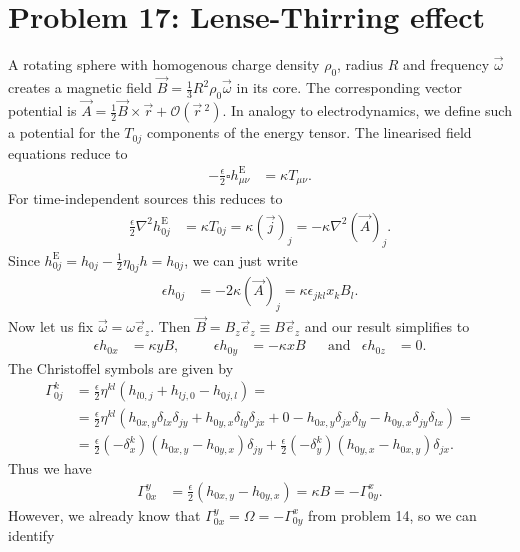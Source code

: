 \documentclass[english, parskip=full]{scrartcl}
\newcommand{\kla}{}
\newcommand{\tecxt}{}
\begin{document}
\section{Problem 17: Lense-Thirring effect}
A rotating sphere with homogenous charge density $\rho_0$, radius $R$ and frequency $\vec{\omega}$ creates a magnetic field $\vec{B} = \frac{1}{3}R^2\rho_0\vec{\omega}$ in its core.
The corresponding vector potential is $\vec{A} = \frac{1}{2} \vec{B}\times\vec{r} + \mathcal{O}(\vec{r}\,^2)$.
In analogy to electrodynamics, we define such a potential for the $T_{0j}$ components of the energy tensor.
The linearised field equations reduce to
\begin{align}
-\frac{\epsilon}{2}\square h^\tecxt\text{E}_{\mu\nu} &= \kappa T_{\mu\nu}.
\end{align}
For time-independent sources this reduces to
\begin{align}
\frac{\epsilon}{2} \nabla^2 h^\tecxt\text{E}_{0j} &= \kappa T_{0j} = \kappa (\vec{j})_j = -\kappa\nabla^2(\vec{A})_j.
\end{align}
Since $h^\tecxt\text{E}_{0j} = h_{0j} - \frac{1}{2}\eta_{0j}h = h_{0j}$, we can just write
\begin{align}
\epsilon h_{0j} &= -2\kappa (\vec{A})_j = \kappa \epsilon_{jkl} x_kB_l.
\end{align}
Now let us fix $\vec{\omega} = \omega\vec{e}_z$.
Then $\vec{B} = B_z \vec{e}_z \equiv B\vec{e}_z$ and our result simplifies to
\begin{align}
\epsilon h_{0x} &= \kappa yB, &&& \epsilon h_{0y} &= -\kappa xB && \tecxt\text{and} & \epsilon h_{0z} &= 0.
\end{align}
The Christoffel symbols are given by
\begin{align}
\Gamma^k_{0j} &= \frac{\epsilon}{2}\eta^{kl} \kla\left( h_{l0,j} + h_{lj,0} - h_{0j,l} \right) = \\
&= \frac{\epsilon}{2} \eta^{kl} \kla\left( h_{0x,y} \delta_{lx}\delta_{jy} + h_{0y,x} \delta_{ly} \delta_{jx} + 0 - h_{0x,y} \delta_{jx} \delta_{ly} - h_{0y,x} \delta_{jy} \delta_{lx} \right) = \\
&= \frac{\epsilon}{2} (-\delta^k_x) (h_{0x,y} - h_{0y,x}) \delta_{jy} + \frac{\epsilon}{2} (-\delta^k_y) (h_{0y,x} - h_{0x,y}) \delta_{jx}.
\end{align}
Thus we have 
\begin{align}
\Gamma^y_{0x} &= \frac{\epsilon}{2} (h_{0x,y} - h_{0y,x}) = \kappa B = -\Gamma^x_{0y}.
\end{align}
However, we already know that $\Gamma^y_{0x} = \Omega = -\Gamma^x_{0y}$ from problem 14, so we can identify
\end{document}

